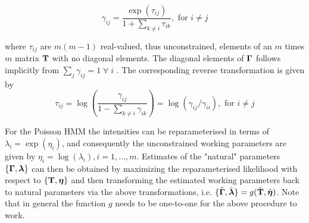 \documentclass[bimj,fleqn]{w-art}\usepackage[]{graphicx}\usepackage[]{color}
\newcommand{\bct}{{\bf T}}
\newcommand{\bgamma}{\mbox{\boldmath $\Gamma$}}
\newcommand{\bfeta}{\mbox{\boldmath $\eta$}}
\newcommand{\bflambda}{\mbox{\boldmath $\lambda$}}
\theoremstyle{plain}
\theoremstyle{definition}
\begin{document}
\begin{equation*}
\gamma_{ij} = \frac{\exp(\tau_{ij})}{1 + \sum_{k \neq i} \tau_{ik}}, \text{ for } i \neq j
\end{equation*}

where $\tau_{ij}$ are $m(m-1)$ real-valued, thus unconstrained, elements of an $m$ times $m$ matrix $\bct$ with no diagonal elements. The diagonal elements of $\bgamma$ follows implicitly from $\sum_j \gamma_{ij} = 1 \;\forall\; i$ \cite[p. ~51]{zucchini}. The corresponding reverse transformation is given by
\begin{equation*}
\tau_{ij} = \log\left(\frac{\gamma_{ij}}{1 - \sum_{k \neq i} \gamma_{ik}}\right) = \log(\gamma_{ij}/\gamma_{ii}), \text{ for } i \neq j
\end{equation*}

For the Poisson HMM the intensities can be reparameterised in terms of $\lambda_i = \exp(\eta_i)$, and consequently the unconstrained working parameters are given by $\eta_i = \log(\lambda_i), i = 1,\dots,m$. Estimates of the "natural" parameters $\{\bgamma, \bflambda\}$ can then be obtained by maximizing the reparameterised likelihood with respect to $\{\bct, \bfeta\}$ and then transforming the estimated working parameters back to natural parameters via the above transformations, i.e. $\{\hat{\bgamma}, \hat{\bflambda}\} = g(\hat{\bct}, \hat{\bfeta})$. Note that in general the function $g$ needs to be one-to-one for the above procedure to work.

% 
% 
% 
% 
\end{document}
